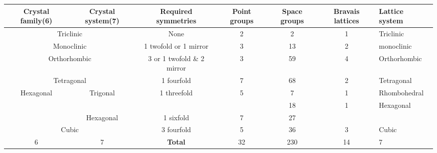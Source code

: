 \documentclass{article}
\begin{document}
\begin{tabular}{| c| c| c| c| c| c| l|}
    \hline
    Crystal family(6)&Crystal system(7)&Required symmetries&Point groups&Space groups&Bravais lattices&Lattice system\\
    \hline
     \multicolumn{2}{|c|}{Triclinic} & None & 2 & 2 & 1 &{Triclinic} \\
     \hline
     \multicolumn{2}{|c|}{Monoclinic} & 1 twofold or 1 mirror & 3 & 13 & 2 & {monoclinic} \\\hline
     \multicolumn{2}{|c|}{Orthorhombic} & 3 or 1 twofold \& 2 mirror & 3 & 59 & 4 & {Orthorhombic} \\\hline
     \multicolumn{2}{|c|}{Tetragonal} & 1 fourfold & 7 & 68 & 2 &  {Tetragonal}\\\hline
    \multirow{3}{*}{Hexagonal} & \multirow{2}{*}{Trigonal} &\multirow{2}{*}{ 1 threefold  }& \multirow{2}{*}{5} & 7 & 1 & Rhombohedral\\ \cline{5-7}
    &&&&18&\multirow{2}{*}{1}&\multirow{2}{*}{Hexagonal}\\\cline{2-5}
    &Hexagonal & 1 sixfold  & 7 & 27 && \\\hline
    \multicolumn{2}{|c|}{Cubic} & 3 fourfold & 5 & 36 & 3 &  {Cubic}\\\hline
    6 & 7 & \textbf{Total} & 32 & 230 & 14 & 7\\
    \hline
    \end{tabular}
    
\end{document}
